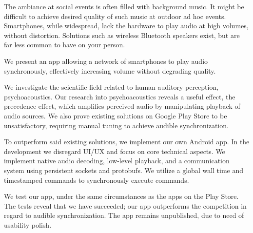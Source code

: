The ambiance at social events is often filled with background music.
It might be difficult to achieve desired quality of such music at outdoor ad hoc events.
Smartphones, while widespread, lack the hardware to play audio at high volumes, without distortion.
Solutions such as wireless Bluetooth speakers exist, but are far less common to have on your person.

We present an app allowing a network of smartphones to play audio synchronously, effectively increasing volume without degrading quality.

\bigskip \noindent
We investigate the scientific field related to human auditory perception, psychoacoustics.
Our research into psychoacoustics reveals a useful effect, the precedence effect, which amplifies perceived audio by manipulating playback of audio sources.
We also prove existing solutions on Google Play Store to be unsatisfactory, requiring manual tuning to achieve audible synchronization.

\bigskip \noindent
To outperform said existing solutions, we implement our own Android app.
In the development we disregard UI/UX and focus on core technical aspects.
We implement native audio decoding, low-level playback, and a communication system using persistent sockets and protobufs.
We utilize a global wall time and timestamped commands to synchronously execute commands.

\bigskip \noindent
We test our app, under the same circumstances as the apps on the Play Store.
The tests reveal that we have succeeded; our app outperforms the competition in regard to audible synchronization.
The app remains unpublished, due to need of usability polish.
